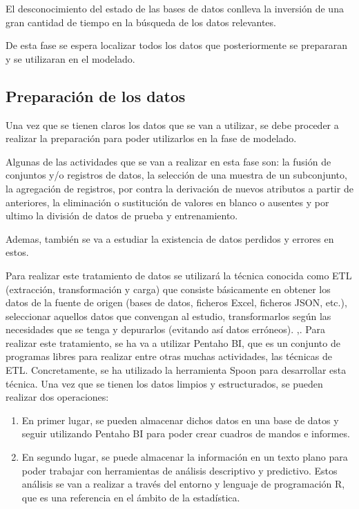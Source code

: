El desconocimiento del estado de las bases de datos conlleva la inversión de una gran cantidad de tiempo en la búsqueda de los datos relevantes. 


De esta fase se espera localizar todos los datos que posteriormente se prepararan y se utilizaran en el modelado.

\subsection{Preparación de los datos}
Una vez que se tienen claros los datos que se van a utilizar, se debe proceder a realizar la preparación para poder utilizarlos en la fase de modelado.

Algunas de las actividades que se van a realizar en esta fase son: la fusión de conjuntos y/o registros de datos, la selección de una muestra de un subconjunto, la agregación de registros, por contra la derivación de nuevos atributos a partir de anteriores, la eliminación o sustitución de valores en blanco o ausentes y por ultimo la división de datos de prueba y entrenamiento.

Ademas, también se va a estudiar la existencia de datos perdidos y errores en estos.

Para realizar este tratamiento de datos se utilizará la técnica conocida como ETL (extracción, transformación y carga) que consiste básicamente en obtener los datos de la fuente de origen (bases de datos, ficheros Excel, ficheros JSON, etc.), seleccionar aquellos datos que convengan al estudio, transformarlos según las necesidades que se tenga y depurarlos (evitando así datos erróneos). \cite{prakash2017etl} \cite{matos2006metodologia},\cite{gour2010improve}.
Para realizar este tratamiento, se ha va a utilizar Pentaho BI, que es un conjunto de programas libres para realizar entre otras muchas actividades, las técnicas de ETL. Concretamente, se ha utilizado la herramienta Spoon para desarrollar esta técnica. 
Una vez que se tienen los datos limpios y estructurados, se pueden realizar dos operaciones:

\begin{enumerate}
	\item  En primer lugar, se pueden almacenar dichos datos en una base de datos y seguir utilizando Pentaho BI para poder crear cuadros de mandos e informes. 
	\item  En segundo lugar, se puede almacenar la información en un texto plano para poder trabajar con herramientas de análisis descriptivo y predictivo. Estos análisis se van a realizar a través del entorno y lenguaje de programación R, que es una referencia en el ámbito de la estadística.
\end{enumerate}

